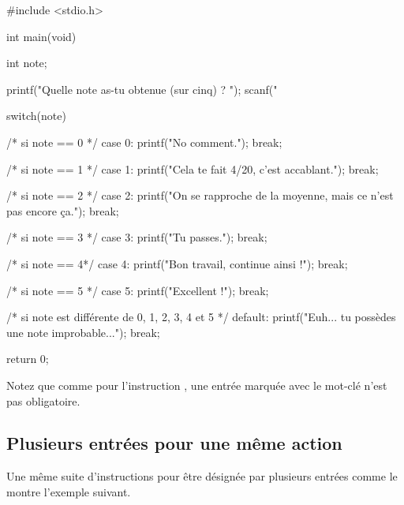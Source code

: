 \begin{C}
#include <stdio.h>


int main(void)
{
    int note;

    printf("Quelle note as-tu obtenue (sur cinq) ? ");
    scanf("%

    switch(note)
    {
    /* si note == 0 */
    case 0:
        printf("No comment.\n");
        break;

    /* si note == 1 */
    case 1:
        printf("Cela te fait 4/20, c'est accablant.\n");
        break;

    /* si note == 2 */   
    case 2:
        printf("On se rapproche de la moyenne, mais ce n'est pas encore ça.\n");
        break;

    /* si note == 3 */
    case 3:
        printf("Tu passes.\n");
        break;

    /* si note == 4*/
    case 4:
        printf("Bon travail, continue ainsi !\n");
        break;

    /* si note == 5 */
    case 5:
        printf("Excellent !\n");
        break;

    /* si note est différente de 0, 1, 2, 3, 4 et 5 */
    default:
        printf("Euh... tu possèdes une note improbable...\n");
        break;
    }

    return 0;
}
\end{C}

\begin{infobox} Notez que comme pour l'instruction
, une entrée marquée avec le mot-clé  n'est
pas obligatoire.
\end{infobox}

\subsection{Plusieurs entrées pour une même action}
\label{plusieurs-entrees-pour-une-muxeame-action}

Une même suite d'instructions pour être désignée par plusieurs entrées
comme le montre l'exemple suivant.

